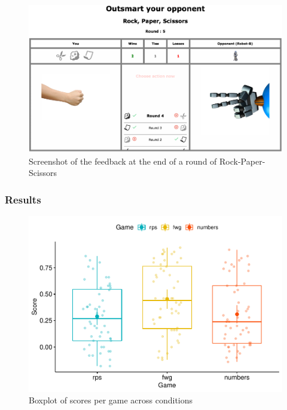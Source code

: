 \documentclass[man,floatsintext]{apa6}
\begin{document}
\begin{figure}

{\centering \includegraphics{images/feedback_rps} 

}

\caption{Screenshot of the feedback at the end of a round of Rock-Paper-Scissors}\label{fig:feedback-rps-exp2}
\end{figure}

\hypertarget{results}{%
\subsubsection{Results}\label{results}}

\begin{figure}

{\centering \includegraphics{draft_report_v3_files/figure-latex/exp1-avg-scores-game-1} 

}

\caption{Boxplot of scores per game across conditions}\label{fig:exp1-avg-scores-game}
\end{figure}
\end{document}
